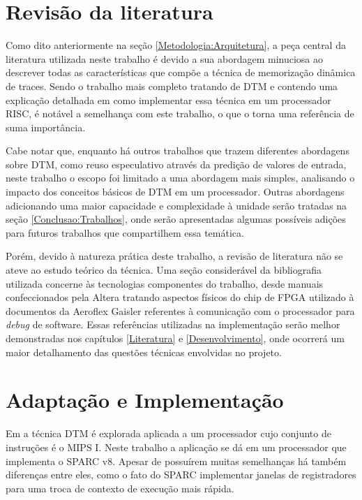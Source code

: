 \section{Revisão da literatura}
\label{Metodologia:Literatura}

Como dito anteriormente na seção \ref{Metodologia:Arquitetura}, a peça central da literatura utilizada neste trabalho é  devido a sua abordagem minuciosa ao descrever todas as características que compõe a técnica de memorização dinâmica de traces. Sendo o trabalho mais completo tratando de DTM e contendo uma explicação detalhada em como implementar essa técnica em um processador RISC, é notável a semelhança com este trabalho, o que o torna uma referência de suma importância.

Cabe notar que, enquanto há outros trabalhos que trazem diferentes abordagens sobre DTM, como reuso especulativo através da predição de valores de entrada, neste trabalho o escopo foi limitado a uma abordagem mais simples, analisando o impacto dos conceitos básicos de DTM em um processador. Outras abordagens adicionando uma maior capacidade e complexidade à unidade serão tratadas na seção \ref{Conclusao:Trabalhos}, onde serão apresentadas algumas possíveis adições para futuros trabalhos que compartilhem essa temática.



Porém, devido à natureza prática deste trabalho, a revisão de literatura não se ateve ao estudo teórico da técnica. Uma seção considerável da bibliografia utilizada concerne às tecnologias componentes do trabalho, desde manuais confeccionados pela Altera tratando aspectos físicos do chip de FPGA utilizado à documentos da Aeroflex Gaisler referentes à comunicação com o processador para \textit{debug} de software. Essas referências utilizadas na implementação serão melhor demonstradas nos capítulos \ref{Literatura} e \ref{Desenvolvimento}, onde ocorrerá um maior detalhamento das questões técnicas envolvidas no projeto.


\section{Adaptação e Implementação}
\label{Metodologia:Implementacao}

Em  a técnica DTM é explorada aplicada a um processador cujo conjunto de instruções é o MIPS I. Neste trabalho a aplicação se dá em um processador que implementa o SPARC v8. Apesar de possuírem muitas semelhanças há também diferenças entre eles, como o fato do SPARC implementar janelas de registradores para uma troca de contexto de execução mais rápida.

